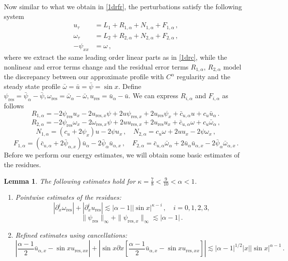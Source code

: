 \documentclass[12pt]{caltech_thesis}
\newtheorem{lemma}[theorem]{Lemma}
\numberwithin{equation}{section}
\begin{document}
Now similar to what we obtain in \eqref{1drfr}, the perturbations satisfy the following system
\begin{equation}
\label{1drfr-alpha}
\begin{aligned}
{u}_{ \tau} &=L_1+R_{1,\alpha}+N_{1,\alpha}+F_{1,\alpha}\,, \\
{\omega}_{ \tau}&=L_2+R_{2,\alpha}+N_{2,\alpha}+F_{2,\alpha}\,, \\
-{\psi}_{xx} &={\omega}\,,
\end{aligned}
\end{equation}
where we extract the same leading order linear parts  as in \eqref{1drc}, while the nonlinear and error terms change and the residual error terms $R_{1,\alpha}$, $R_{2,\alpha}$ model the discrepancy between our approximate profile with $C^{\alpha}$ regularity and the steady state profile $\bar{\omega}=\bar{u}=\bar{\psi}=\sin x$. Define $\psi_{\text{res}}=\bar{\psi}_{\alpha}-\bar{\psi},\omega_{\text{res}}=\bar{\omega}_{\alpha}-\bar{\omega},u_{\text{res}}=\bar{u}_{\alpha}-\bar{u}$. We can express $R_{i,\alpha}$ and $F_{i,\alpha}$ as follows
$$R_{1,\alpha}=-2 \psi_{\text{res}} u_x-2 u_{\text{res},x} \psi+ 2 u \psi_{\text{res},x}+2u_{\text{res}} \psi_x+\bar{c}_{u,\alpha} u+ c_u\bar{u}_\alpha
\,.\,$$ 
$$R_{2,\alpha}=-2\psi_{\text{res}} \omega_x-2\omega_{\text{res},x}\psi +2 u u_{\text{res},x}+2u_{\text{res}} u_x+\bar{c}_{u,\alpha} \omega+c_u\bar{\omega}_{\alpha}\,,$$
$$N_{1,\alpha}=(c_u+2\psi_x)u-2\psi u_x\,,\quad N_{2,\alpha}=c_u\omega+2uu_x-2\psi \omega_x\,,$$
$$F_{1,\alpha}=(\bar{c}_{u,\alpha}+2\bar{\psi}_{\alpha,x})\bar{u}_{\alpha}-2\bar{\psi}_{\alpha} \bar{u}_{\alpha,x}\,,\quad F_{2,\alpha}=\bar{c}_{u,\alpha}\bar{\omega}_{\alpha}+2\bar{u}_{\alpha}\bar{u}_{\alpha,x}-2\bar{\psi}_{\alpha} \bar{\omega}_{\alpha,x}\,.$$
Before we perform our energy estimates, we will obtain some basic estimates of the residues.
\begin{lemma}
\label{residue-lemma}
The following estimates hold for $\kappa=\frac{7}{8}<\frac{9}{10}<\alpha<1$.
\begin{enumerate}
    \item Pointwise estimates of the residues:
    $$|\partial_x^i\omega_{\text{res}}|+|\partial_x^i u_{\text{res}}|\lesssim |\alpha-1||\sin x|^{\kappa-i}\,,\quad i=0,1,2,3,$$ $$\|\psi_{\text{res}}\|_{\infty}+\|\psi_{\text{res},x}\|_{\infty}\lesssim |\alpha-1|\,.$$
    \item Refined estimates using cancellations:
    $$|\frac{\alpha-1}{2}\bar{u}_{\alpha,x}-\sin xu_{\text{res},xx}|+|\sin x\partial x[\frac{\alpha-1}{2}\bar{u}_{\alpha,x}-\sin xu_{\text{res},xx}]|\lesssim |\alpha-1|^{1/2}|x||\sin x|^{\alpha-1}\,.$$
\end{enumerate}
\end{lemma}
\end{document}
